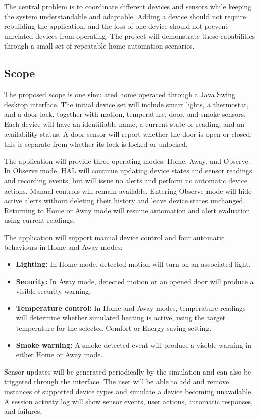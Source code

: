 \documentclass[12pt,letterpaper]{report}
\begin{document}
The central problem is to coordinate different devices and sensors while keeping the system understandable and adaptable. Adding a device should not require rebuilding the application, and the loss of one device should not prevent unrelated devices from operating. The project will demonstrate these capabilities through a small set of repeatable home-automation scenarios.

\subsection{Scope}
The proposed scope is one simulated home operated through a Java Swing desktop interface. The initial device set will include smart lights, a thermostat, and a door lock, together with motion, temperature, door, and smoke sensors. Each device will have an identifiable name, a current state or reading, and an availability status. A door sensor will report whether the door is open or closed; this is separate from whether its lock is locked or unlocked.

The application will provide three operating modes: Home, Away, and Observe. In Observe mode, HAL will continue updating device states and sensor readings and recording events, but will issue no alerts and perform no automatic device actions. Manual controls will remain available. Entering Observe mode will hide active alerts without deleting their history and leave device states unchanged. Returning to Home or Away mode will resume automation and alert evaluation using current readings.

The application will support manual device control and four automatic behaviours in Home and Away modes:
\begin{itemize}[leftmargin=*]
  \item \textbf{Lighting:} In Home mode, detected motion will turn on an associated light.
  \item \textbf{Security:} In Away mode, detected motion or an opened door will produce a visible security warning.
  \item \textbf{Temperature control:} In Home and Away modes, temperature readings will determine whether simulated heating is active, using the target temperature for the selected Comfort or Energy-saving setting.
  \item \textbf{Smoke warning:} A smoke-detected event will produce a visible warning in either Home or Away mode.
\end{itemize}

Sensor updates will be generated periodically by the simulation and can also be triggered through the interface. The user will be able to add and remove instances of supported device types and simulate a device becoming unavailable. A session activity log will show sensor events, user actions, automatic responses, and failures.
\end{document}
